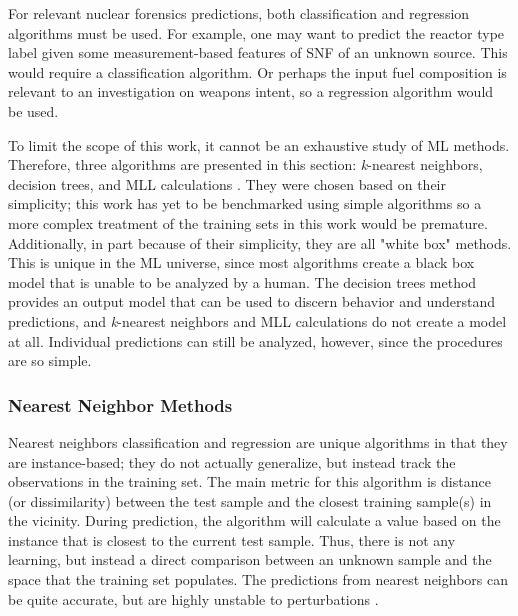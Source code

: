 
For relevant nuclear forensics predictions, both classification and regression
algorithms must be used.  For example, one may want to predict the reactor type
label given some measurement-based features of \gls{SNF} of an unknown source.
This would require a classification algorithm. Or perhaps the input fuel
composition is relevant to an investigation on weapons intent, so a regression
algorithm would be used. 

To limit the scope of this work, it cannot be an exhaustive study of \gls{ML}
methods.  Therefore, three algorithms are presented in this section:
\textit{k}-nearest neighbors, decision trees, and \gls{MLL} calculations
. They were chosen based on their simplicity; this work
has yet to be benchmarked using simple algorithms so a more complex treatment
of the training sets in this work would be premature. Additionally, in part
because of their simplicity, they are all "white box" methods.  This is unique
in the \gls{ML} universe, since most algorithms create a black box model that
is unable to be analyzed by a human.  The  decision trees method provides an
output model that can be used to discern behavior and understand predictions,
and \textit{k}-nearest neighbors and \gls{MLL} calculations do not create a
model at all. Individual predictions can still be analyzed, however, since the
procedures are so simple. 

\subsubsection{Nearest Neighbor Methods}

Nearest neighbors classification and regression are unique algorithms in
that they are instance-based; they do not actually generalize, but instead
track the observations in the training set.  The main metric for this algorithm
is distance (or dissimilarity) between the test sample and the closest training
sample(s) in the vicinity.  During prediction, the algorithm will calculate a
value based on the instance that is closest to the current test sample. Thus,
there is not any learning, but instead a direct comparison between an unknown
sample and the space that the training set populates. The predictions from
nearest neighbors can be quite accurate, but are highly unstable to
perturbations \cite{elements_stats}.

